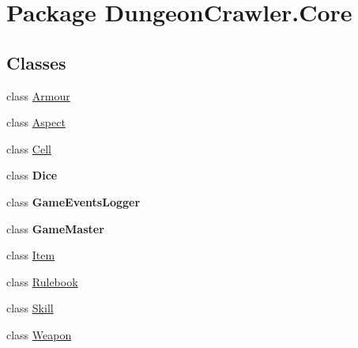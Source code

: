 \hypertarget{namespace_dungeon_crawler_1_1_core}{}\section{Package Dungeon\+Crawler.\+Core}
\label{namespace_dungeon_crawler_1_1_core}
\subsection*{Classes}
\begin{DoxyCompactItemize}
\item 
class \hyperlink{class_dungeon_crawler_1_1_core_1_1_armour}{Armour}
\item 
class \hyperlink{class_dungeon_crawler_1_1_core_1_1_aspect}{Aspect}
\item 
class \hyperlink{class_dungeon_crawler_1_1_core_1_1_cell}{Cell}
\item 
class {\bfseries Dice}
\item 
class {\bfseries Game\+Events\+Logger}
\item 
class {\bfseries Game\+Master}
\item 
class \hyperlink{class_dungeon_crawler_1_1_core_1_1_item}{Item}
\item 
class \hyperlink{class_dungeon_crawler_1_1_core_1_1_rulebook}{Rulebook}
\item 
class \hyperlink{class_dungeon_crawler_1_1_core_1_1_skill}{Skill}
\item 
class \hyperlink{class_dungeon_crawler_1_1_core_1_1_weapon}{Weapon}
\end{DoxyCompactItemize}
